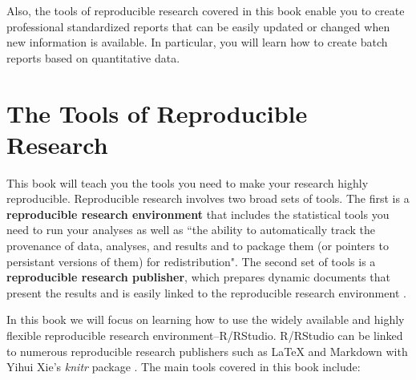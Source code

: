 Also, the tools of reproducible research covered in this book enable you to create professional standardized reports that can be easily updated or changed when new information is available. In particular, you will learn how to create batch reports based on quantitative data.


\section{The Tools of Reproducible Research}

This book will teach you the tools you need to make your research highly reproducible. Reproducible research involves two broad sets of tools. The first is a {\bf{reproducible research environment}} that includes the statistical tools you need to run your analyses as well as ``the ability to automatically track the provenance of data, analyses, and results and to package them (or pointers to persistant versions of them) for redistribution". The second set of tools is a {\bf{reproducible research publisher}}, which prepares dynamic documents that present the results and is easily linked to the reproducible research environment \cite[415]{Mesirov2010}.

In this book we will focus on learning how to use the widely available and highly flexible reproducible research environment--R/RStudio. R/RStudio can be linked to numerous reproducible research publishers such as LaTeX and Markdown with Yihui Xie's {\emph{knitr}} package \citeyearpar{R-knitr}. The main tools covered in this book include:

